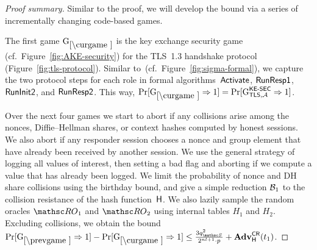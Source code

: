 \begin{proof}[Proof summary]
\let\proofsep\medskip %


Similar to the \SIGMAI proof, we will develop the bound via a series of incrementally changing code-based games. 



The first game $\curGm$ is the key exchange security game (cf.\ Figure~\ref{fig:AKE-security}) for the TLS~1.3 handshake protocol (Figure~\ref{fig:tls-protocol}).
Similar to~\SIGMAI (cf.\ Figure~\ref{fig:sigma-formal}), we capture the two protocol steps for each role in formal algorithms~$\mathsf{Activate}$, $\mathsf{RunResp1}$, $\mathsf{RunInit2}$, and $\mathsf{RunResp2}$.
This way,
$\Pr[\curGm*\Rightarrow 1] = \Pr[ \Gm^{\KESEC}_{\TLS,\advA} \Rightarrow 1 ]$.



Over the next four games we start to abort if any collisions arise among the nonces, Diffie--Hellman shares, or context hashes computed by honest sessions. We also abort if any responder session chooses a nonce and group element that have already been received by another session. We use the general strategy of logging all values of interest, then setting a bad flag and aborting if we compute a value that has already been logged. We limit the probability of nonce and DH share collisions using the birthday bound, and give a simple reduction $\mathcal{B}_1$ to the collision resistance of the hash function~$\mathsf{H}$. We also lazily sample the random oracles $\RO_1$ and $\RO_2$ using internal tables $H_1$ and $H_2$.
Excluding collisions, we obtain the bound
$\Pr[\prevGm*\Rightarrow 1] - \Pr[\curGm\Rightarrow 1] \leq \frac{3\qSend^2}{2^{\nl+1}\cdot p}%
+ \Adv^{\COLL}_{\Hash}(t_1)$.



\end{proof}
